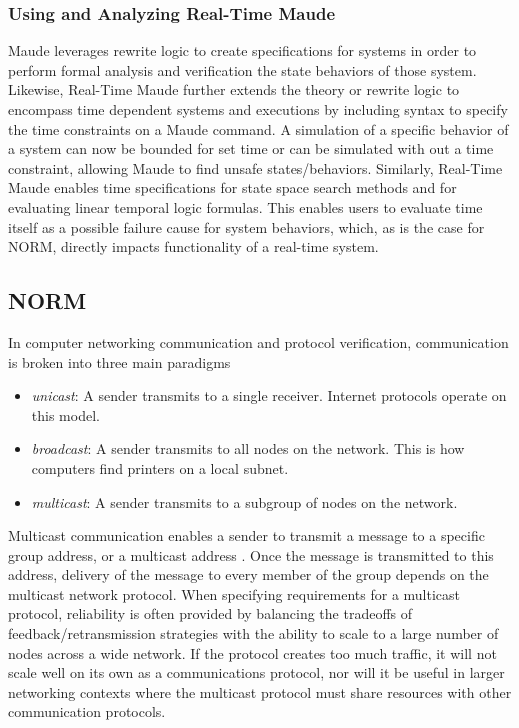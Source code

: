 \documentclass[10pt, journal]{IEEEtran}
\begin{document}
\subsubsection{Using and Analyzing Real-Time Maude}

Maude leverages rewrite logic to create specifications for systems in order to perform formal analysis and verification the state behaviors of those system. Likewise, Real-Time Maude further extends the theory or rewrite logic to encompass time dependent systems and executions by including syntax to specify the time constraints on a Maude command. A simulation of a specific behavior of a system can now be bounded for set time or can be simulated with out a time constraint, allowing Maude to find unsafe states/behaviors. Similarly, Real-Time Maude enables time specifications for state space search methods and for evaluating linear temporal logic formulas. This enables users to evaluate time itself as a possible failure cause for system behaviors, which, as is the case for NORM, directly impacts functionality of a real-time system.

\subsection{NORM}
In computer networking communication and protocol verification, communication is broken into three main paradigms
\begin{itemize}
	\item \textit{unicast}: A sender transmits to a single receiver. Internet protocols operate on this model.
	\item \textit{broadcast}: A sender transmits to all nodes on the network. This is how computers find printers on a local subnet.
	\item \textit{multicast}: A sender transmits to a subgroup of nodes on the network.
\end{itemize}

Multicast communication enables a sender to transmit a message to a specific group address, or a multicast address \cite{Lien2004}. Once the message is transmitted to this address, delivery of the message to every member of the group depends on the multicast network protocol. When specifying requirements for a multicast protocol, reliability is often provided by balancing the tradeoffs of feedback/retransmission strategies with the ability to scale to a large number of nodes across a wide network. If the protocol creates too much traffic, it will not scale well on its own as a communications protocol, nor will it be useful in larger networking contexts where the multicast protocol must share resources with other communication protocols.
\end{document}
